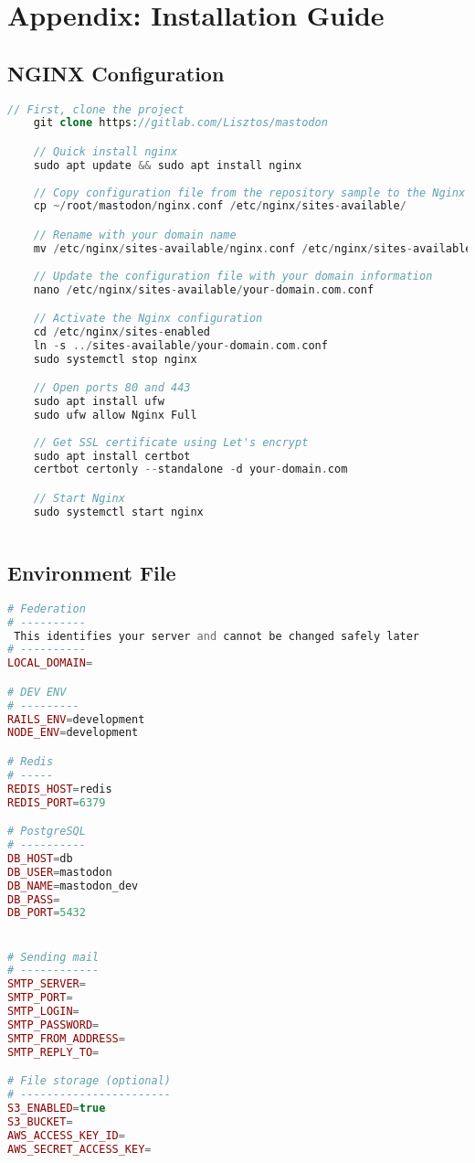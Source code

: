 \chapter{Appendix: Installation Guide}
\label{appendix:installation_guide}

\section{NGINX Configuration}\label{appendix:nginx_configuration}
\lstset{style=CodeStyle}
  \begin{lstlisting}[language=PHP, caption=Adding Nginx configuration file., float=h]
    // First, clone the project
    git clone https://gitlab.com/Lisztos/mastodon

    // Quick install nginx
    sudo apt update && sudo apt install nginx
    
    // Copy configuration file from the repository sample to the Nginx folder
    cp ~/root/mastodon/nginx.conf /etc/nginx/sites-available/

    // Rename with your domain name
    mv /etc/nginx/sites-available/nginx.conf /etc/nginx/sites-available/your-domain.com.conf
    
    // Update the configuration file with your domain information 
    nano /etc/nginx/sites-available/your-domain.com.conf

    // Activate the Nginx configuration
    cd /etc/nginx/sites-enabled
    ln -s ../sites-available/your-domain.com.conf
    sudo systemctl stop nginx

    // Open ports 80 and 443
    sudo apt install ufw
    sudo ufw allow Nginx Full
  
    // Get SSL certificate using Let's encrypt
    sudo apt install certbot
    certbot certonly --standalone -d your-domain.com

    // Start Nginx
    sudo systemctl start nginx
    
\end{lstlisting}


\section{Environment File}\label{appendix:env_file}

\begin{lstlisting}[language=PHP, caption=Environment file template, float=h]
# Federation
# ----------
 This identifies your server and cannot be changed safely later
# ----------
LOCAL_DOMAIN= 

# DEV ENV
# ---------
RAILS_ENV=development
NODE_ENV=development

# Redis
# -----
REDIS_HOST=redis
REDIS_PORT=6379

# PostgreSQL
# ----------
DB_HOST=db
DB_USER=mastodon
DB_NAME=mastodon_dev
DB_PASS=
DB_PORT=5432


# Sending mail
# ------------
SMTP_SERVER=
SMTP_PORT=
SMTP_LOGIN=
SMTP_PASSWORD=
SMTP_FROM_ADDRESS=
SMTP_REPLY_TO=

# File storage (optional)
# -----------------------
S3_ENABLED=true
S3_BUCKET=
AWS_ACCESS_KEY_ID=
AWS_SECRET_ACCESS_KEY=

\end{lstlisting}

